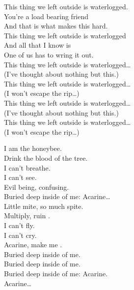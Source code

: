 This thing we left outside is waterlogged. \\
You're a load bearing friend \\
And that is what makes this hard. \\
This thing we left outside is waterlogged \\
And all that I know is \\
One of us has to wring it out. \\

This thing we left outside is waterlogged… \\
(I've thought about nothing but this.) \\

This thing we left outside is waterlogged… \\
(I won't escape the rip…) \\

This thing we left outside is waterlogged… \\
(I've thought about nothing but this.) \\

This thing we left outside is waterlogged… \\
(I won't escape the rip…) \\





I am the honeybee. \\
Drink the blood of the tree. \\
I can't breathe. \\
I can't see. \\
Evil being, confusing. \\

Buried deep inside of me: Acarine… \\

Little mite, so much spite. \\
Multiply, ruin . \\
I can't fly. \\
I can't cry. \\
Acarine, make me . \\

Buried deep inside of me. \\
Buried deep inside of me. \\
Buried deep inside of me: Acarine. \\
Acarine… \\

